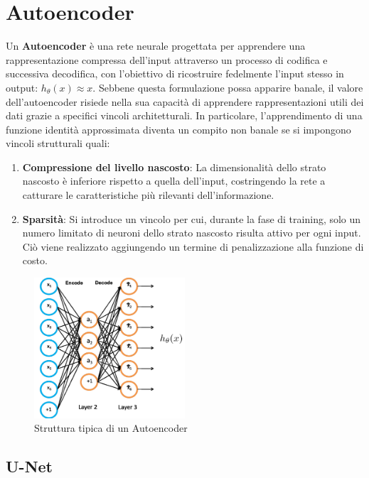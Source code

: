\chapter{Autoencoder}

Un \textbf{Autoencoder} è una rete neurale progettata per apprendere una rappresentazione compressa dell’input attraverso un processo di codifica e successiva decodifica, con l’obiettivo di ricostruire fedelmente l’input stesso in output: $h_\theta (x) \approx x$. Sebbene questa formulazione possa apparire banale, il valore dell'autoencoder risiede nella sua capacità di apprendere rappresentazioni utili dei dati grazie a specifici vincoli architetturali. In particolare, l’apprendimento di una funzione identità approssimata diventa un compito non banale se si impongono vincoli strutturali quali:

\begin{enumerate}
\item \textbf{Compressione del livello nascosto}: La dimensionalità dello strato nascosto è inferiore rispetto a quella dell’input, costringendo la rete a catturare le caratteristiche più rilevanti dell’informazione.
\item \textbf{Sparsità}: Si introduce un vincolo per cui, durante la fase di training, solo un numero limitato di neuroni dello strato nascosto risulta attivo per ogni input. Ciò viene realizzato aggiungendo un termine di penalizzazione alla funzione di costo.
\end{enumerate}

\begin{figure}[h!]
\centering
\includegraphics[width=0.5\textwidth]{figure/AAutoencoder.png}
\caption{Struttura tipica di un Autoencoder}
\label{fig:AutoEnc}
\end{figure}

\section{U-Net}

